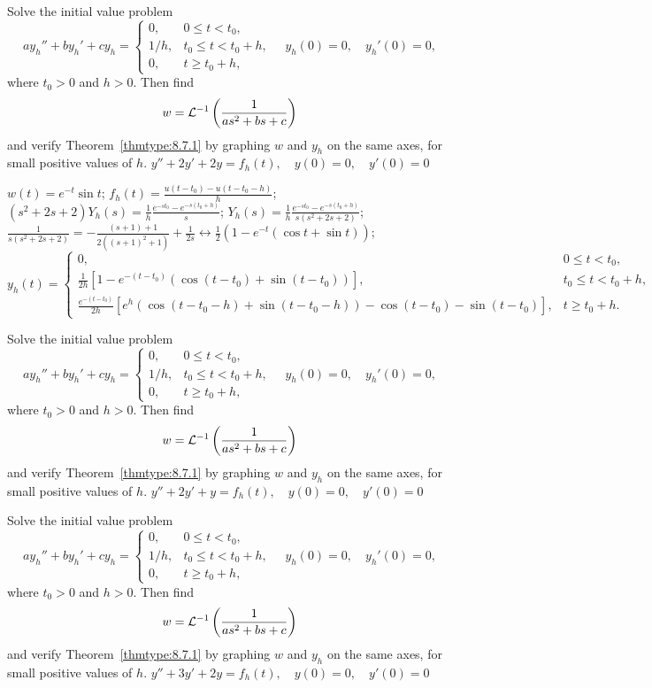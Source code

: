 \documentclass{ximera}
\begin{document}
\begin{problem}\label{exer:8.7.26} Solve the initial value problem
$$
ay_h''+by_h'+cy_h=
\left\{\begin{array}{cl} 0,&0\le t<t_0,\\
1/h,&t_0\le t< t_0+h,\\
0,&t\ge t_0+h,\end{array}\right.
\quad y_h(0)=0,\quad y_h'(0)=0,
$$
where $t_0>0$ and $h>0$. Then find
$$
w={\cal L}^{-1}\left(\frac{1}{as^2+bs+c}\right)
$$
and verify Theorem~\ref{thmtype:8.7.1} by graphing $w$ and $y_h$
on the same axes, for small positive values of $h$.
$y''+2y'+2y=f_h(t), \quad  y(0)=0,\quad y'(0)=0$

\begin{solution}
$w(t)=e^{-t}\sin t$;
$f_h(t)=\frac{u(t-t_0)-u(t-t_0-h)}{h}$;
$(s^2+2s+2)Y_h(s)=\frac{1}{h}\frac{e^{-st_0}-e^{-s(t_0+h)}}{s}$;
$Y_h(s)=\frac{1}{h}\frac{e^{-st_0}-e^{-s(t_0+h)}}{s(s^2+2s+2)}$;
$\frac{1}{s(s^2+2s+2)}=-\frac{(s+1)+1}{2\left((s+1)^2+1\right)}
+\frac{1}{2s}\leftrightarrow
\frac{1}{2}\left(1-e^{-t}(\cos t+\sin t)\right)$;
$$
y_h(t)=
\left\{\begin{array}{cl} 0,&0\le t<t_0,\\ 
\frac{1}{2h}\left[1-e^{-(t-t_0)}(\cos(t-t_0)+\sin(t-t_0))\right],
&t_0\le t< t_0+h,\\ 
\frac{e^{-(t-t_0)}}{2h}\left[e^h\left(\cos(t-t_0-h)+\sin(t-t_0-h)\right)
-\cos(t-t_0)-\sin(t-t_0)\right] ,&t\ge t_0+h.\end{array}\right.
$$
\end{solution}
\end{problem}

\begin{problem}\label{exer:8.7.27} Solve the initial value problem
$$
ay_h''+by_h'+cy_h=
\left\{\begin{array}{cl} 0,&0\le t<t_0,\\
1/h,&t_0\le t< t_0+h,\\
0,&t\ge t_0+h,\end{array}\right.
\quad y_h(0)=0,\quad y_h'(0)=0,
$$
where $t_0>0$ and $h>0$. Then find
$$
w={\cal L}^{-1}\left(\frac{1}{as^2+bs+c}\right)
$$
and verify Theorem~\ref{thmtype:8.7.1} by graphing $w$ and $y_h$
on the same axes, for small positive values of $h$.
$y''+2y'+y=f_h(t), \quad  y(0)=0,\quad y'(0)=0$
\end{problem}

\begin{problem}\label{exer:8.7.28} Solve the initial value problem
$$
ay_h''+by_h'+cy_h=
\left\{\begin{array}{cl} 0,&0\le t<t_0,\\
1/h,&t_0\le t< t_0+h,\\
0,&t\ge t_0+h,\end{array}\right.
\quad y_h(0)=0,\quad y_h'(0)=0,
$$
where $t_0>0$ and $h>0$. Then find
$$
w={\cal L}^{-1}\left(\frac{1}{as^2+bs+c}\right)
$$
and verify Theorem~\ref{thmtype:8.7.1} by graphing $w$ and $y_h$
on the same axes, for small positive values of $h$.
$y''+3y'+2y=f_h(t), \quad  y(0)=0,\quad y'(0)=0$
\end{problem}
\end{document}

